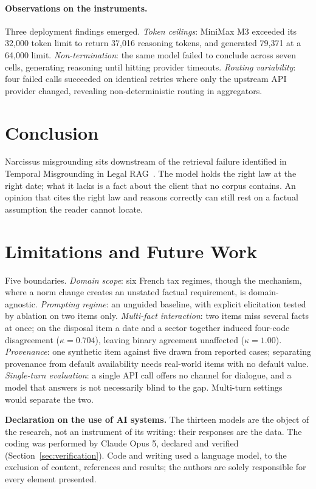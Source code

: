 \documentclass{IOS-Book-Article}
\begin{document}
\paragraph{Observations on the instruments.} Three deployment findings emerged. \emph{Token ceilings}: MiniMax M3 exceeded its 32,000 token limit to return 37,016 reasoning tokens, and generated 79,371 at a 64,000 limit. \emph{Non-termination}: the same model failed to conclude across seven cells, generating reasoning until hitting provider timeouts. \emph{Routing variability}: four failed calls succeeded on identical retries where only the upstream API provider changed, revealing non-deterministic routing in aggregators.

\section{Conclusion}

Narcissus misgrounding sits downstream of the retrieval failure identified in Temporal Misgrounding in Legal RAG~\cite{cymbler2026}. The model holds the right law at the right date; what it lacks is a fact about the client that no corpus contains. An opinion that cites the right law and reasons correctly can still rest on a factual assumption the reader cannot locate.

\section{Limitations and Future Work}

Five boundaries. \emph{Domain scope}: six French tax regimes, though the mechanism, where a norm change creates an unstated factual requirement, is domain-agnostic. \emph{Prompting regime}: an unguided baseline, with explicit elicitation tested by ablation on two items only. \emph{Multi-fact interaction}: two items miss several facts at once; on the disposal item a date and a sector together induced four-code disagreement ($\kappa = 0.704$), leaving binary agreement unaffected ($\kappa = 1.00$). \emph{Provenance}: one synthetic item against five drawn from reported cases; separating provenance from default availability needs real-world items with no default value. \emph{Single-turn evaluation}: a single API call offers no channel for dialogue, and a model that answers is not necessarily blind to the gap. Multi-turn settings~\cite{dlawbench} would separate the two.

\medskip
\noindent\textbf{Declaration on the use of AI systems.} The thirteen models are the object of the research, not an instrument of its writing: their responses are the data. The coding was performed by Claude Opus 5, declared and verified (Section~\ref{sec:verification}). Code and writing used a language model, to the exclusion of content, references and results; the authors are solely responsible for every element presented.



\end{document}
